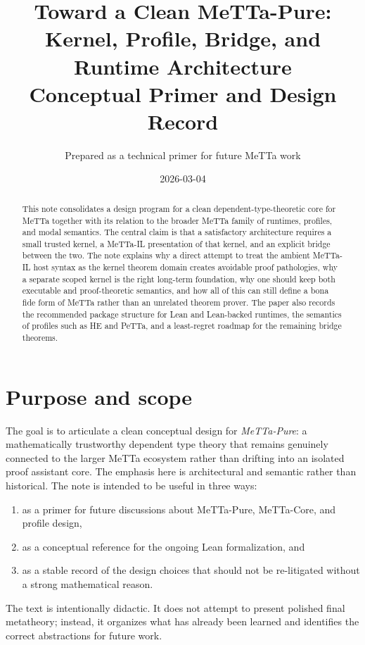 \documentclass[11pt]{article}
\title{Toward a Clean MeTTa-Pure:\\
Kernel, Profile, Bridge, and Runtime Architecture\\
\large Conceptual Primer and Design Record}
\author{Prepared as a technical primer for future MeTTa work}
\date{2026-03-04}
\begin{document}
\maketitle

\begin{abstract}
This note consolidates a design program for a clean dependent-type-theoretic core for MeTTa together with its relation to the broader MeTTa family of runtimes, profiles, and modal semantics. The central claim is that a satisfactory architecture requires a small trusted kernel, a MeTTa-IL presentation of that kernel, and an explicit bridge between the two. The note explains why a direct attempt to treat the ambient MeTTa-IL host syntax as the kernel theorem domain creates avoidable proof pathologies, why a separate scoped kernel is the right long-term foundation, why one should keep both executable and proof-theoretic semantics, and how all of this can still define a bona fide form of MeTTa rather than an unrelated theorem prover. The paper also records the recommended package structure for Lean and Lean-backed runtimes, the semantics of profiles such as HE and PeTTa, and a least-regret roadmap for the remaining bridge theorems.
\end{abstract}

\tableofcontents

\section{Purpose and scope}

The goal is to articulate a clean conceptual design for \emph{MeTTa-Pure}: a mathematically trustworthy dependent type theory that remains genuinely connected to the larger MeTTa ecosystem rather than drifting into an isolated proof assistant core. The emphasis here is architectural and semantic rather than historical. The note is intended to be useful in three ways:

\begin{enumerate}
  \item as a primer for future discussions about MeTTa-Pure, MeTTa-Core, and profile design,
  \item as a conceptual reference for the ongoing Lean formalization, and
  \item as a stable record of the design choices that should not be re-litigated without a strong mathematical reason.
\end{enumerate}

The text is intentionally didactic. It does not attempt to present polished final metatheory; instead, it organizes what has already been learned and identifies the correct abstractions for future work.
\end{document}
